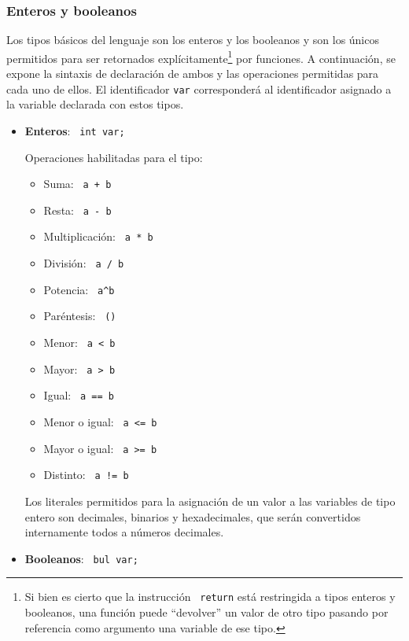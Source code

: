 \documentclass[10pt,a4paper]{article}
\begin{document}
\subsubsection{Enteros y booleanos}
Los tipos básicos del lenguaje son los enteros y los booleanos y son los únicos permitidos para ser retornados explícitamente\footnote{Si bien es cierto que la instrucción \texttt{\color{blue} return} está restringida a tipos enteros y booleanos, una función puede ``devolver'' un valor de otro tipo pasando por referencia como argumento una variable de ese tipo.} por funciones. A continuación, se expone la sintaxis de declaración de ambos y las operaciones permitidas para cada uno de ellos. El identificador \texttt{var} corresponderá al identificador asignado a la variable declarada con estos tipos.
\begin{itemize}
    \item \textbf{Enteros}: \texttt{\color{blue} int var;}
    
    Operaciones habilitadas para el tipo:
    \begin{itemize}
        \item Suma: \texttt{\color{blue} a + b}
        \item Resta: \texttt{\color{blue} a - b}
        \item Multiplicación: \texttt{\color{blue} a * b}
        \item División: \texttt{\color{blue} a / b}
        \item Potencia: \texttt{\color{blue} a\^{}b}
        \item Paréntesis: \texttt{\color{blue} ()}
        \item Menor: \texttt{\color{blue} a \textless{} b}
        \item Mayor: \texttt{\color{blue} a \textgreater{} b}
        \item Igual: \texttt{\color{blue} a == b}
        \item Menor o igual: \texttt{\color{blue} a \textless{}= b}
        \item Mayor o igual: \texttt{\color{blue} a \textgreater{}= b}
        \item Distinto: \texttt{\color{blue} a != b}
    \end{itemize}
    Los literales permitidos para la asignación de un valor a las variables de tipo entero son decimales, binarios y hexadecimales, que serán convertidos internamente todos a números decimales.

    \item \textbf{Booleanos}: \texttt{\color{blue} bul var;}
    

\end{itemize}
\end{document}

